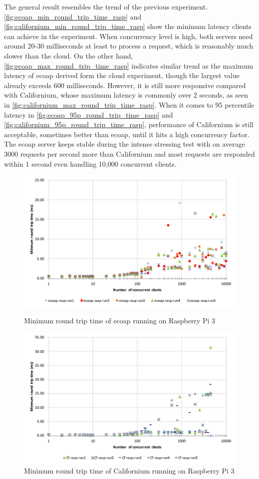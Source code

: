 The general result resembles the trend of the previous experiment. \autoref{fig:ecoap_min_round_trip_time_rasp} and \autoref{fig:californium_min_round_trip_time_rasp} show the minimum latency clients can achieve in the experiment. When concurrency level is high, both servers need around 20-30 milliseconds at least to process a request, which is reasonably much slower than the cloud.
On the other hand, \autoref{fig:ecoap_max_round_trip_time_rasp} indicates similar trend as the maximum latency of ecoap derived form the cloud experiment, though the largest value already exceeds 600 milliseconds. However, it is still more responsive compared with Californium, whose maximum latency is commonly over 2 seconds, as seen in \autoref{fig:californium_max_round_trip_time_rasp}. When it comes to 95 percentile latency in \autoref{fig:ecoap_95p_round_trip_time_rasp} and \autoref{fig:californium_95p_round_trip_time_rasp}, performance of Californium is still acceptable, sometimes better than ecoap, until it hits a high concurrency factor. The ecoap server keeps stable during the intense stressing test with on average 3000 requests per second more than Californium and most requests are responded within 1 second even handling 10,000 concurrent clients.

\begin{figure}[!htbp]
\centering
\includegraphics[scale = 0.8]{ecoap_min_round_trip_time_rasp}
\caption{Minimum round trip time of ecoap running on Raspberry Pi 3}
\label{fig:ecoap_min_round_trip_time_rasp}
\includegraphics[scale = 0.8]{californium_min_round_trip_time_rasp}
\caption{Minimum round trip time of Californium running on Raspberry Pi 3}
\label{fig:californium_min_round_trip_time_rasp}
\end{figure}

